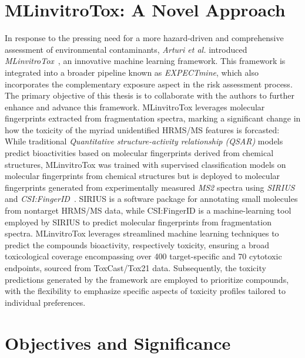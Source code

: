 \section{MLinvitroTox: A Novel Approach}

In response to the pressing need for a more hazard-driven and comprehensive assessment of environmental contaminants, \emph{Arturi et al.} introduced \emph{MLinvitroTox}~\cite{arturi}, an innovative machine learning framework. This framework is integrated into a broader pipeline known as \emph{EXPECTmine}, which also incorporates the complementary exposure aspect in the risk assessment process. The primary objective of this thesis is to collaborate with the authors to further enhance and advance this framework. MLinvitroTox leverages molecular fingerprints extracted from fragmentation spectra, marking a significant change in how the toxicity of the myriad unidentified HRMS/MS features is forcasted: While traditional \emph{Quantitative structure-activity relationship (QSAR)} models predict bioactivities based on molecular fingerprints derived from chemical structures, MLinvitroTox was trained with supervised classification models on molecular fingerprints from chemical structures but is deployed to molecular fingerprints generated from experimentally measured \emph{MS2} spectra using \emph{SIRIUS} and \emph{CSI:FingerID}~\cite{sirius2019}. SIRIUS is a software package for annotating small molecules from nontarget HRMS/MS data, while CSI:FingerID is a machine-learning tool employed by SIRIUS to predict molecular fingerprints from fragmentation spectra. MLinvitroTox leverages streamlined machine learning techniques to predict the compounds bioactivity, respectively toxicity, ensuring a broad toxicological coverage encompassing over 400 target-specific and 70 cytotoxic endpoints, sourced from ToxCast/Tox21 data. Subsequently, the toxicity predictions generated by the framework are employed to prioritize compounds, with the flexibility to emphasize specific aspects of toxicity profiles tailored to individual preferences.

\section{Objectives and Significance}

